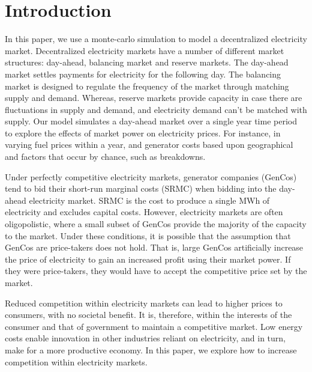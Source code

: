 \documentclass[conference]{IEEEtran}
\begin{document}
\section{Introduction}
\label{sec:introduction}

In this paper, we use a monte-carlo simulation to model a decentralized electricity market. Decentralized electricity markets have a number of different market structures: day-ahead, balancing market and reserve markets. The day-ahead market settles payments for electricity for the following day. The balancing market is designed to regulate the frequency of the market through matching supply and demand. Whereas, reserve markets provide capacity in case there are fluctuations in supply and demand, and electricity demand can't be matched with supply. Our model simulates a day-ahead market over a single year time period to explore the effects of market power on electricity prices. For instance, in varying fuel prices within a year, and generator costs based upon geographical and factors that occur by chance, such as breakdowns.

Under perfectly competitive electricity markets, generator companies (GenCos) tend to bid their short-run marginal costs (SRMC) when bidding into the day-ahead electricity market. SRMC is the cost to produce a single MWh of electricity and excludes capital costs. However, electricity markets are often oligopolistic, where a small subset of GenCos provide the majority of the capacity to the market. Under these conditions, it is possible that the assumption that GenCos are price-takers does not hold. That is, large GenCos artificially increase the price of electricity to gain an increased profit using their market power. If they were price-takers, they would have to accept the competitive price set by the market.

Reduced competition within electricity markets can lead to higher prices to consumers, with no societal benefit. It is, therefore, within the interests of the consumer and that of government to maintain a competitive market. Low energy costs enable innovation in other industries reliant on electricity, and in turn, make for a more productive economy. In this paper, we explore how to increase competition within electricity markets.
\end{document}
